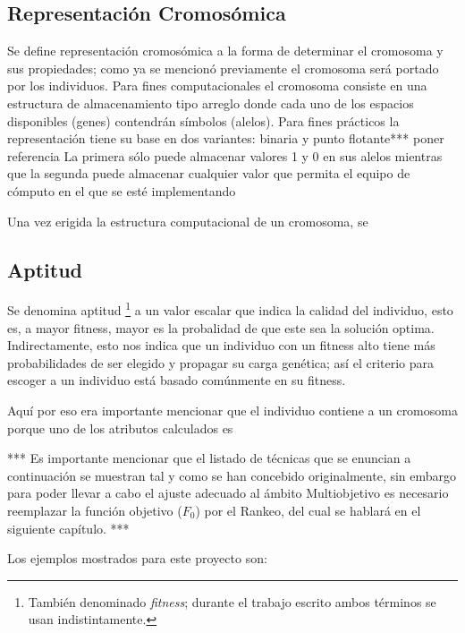 \documentclass[class=report, crop=false]{standalone}
\begin{document}
\subsection{Representación Cromosómica}
\label{sec:c2_5}
Se define representación cromosómica a la forma de determinar 
el cromosoma y sus propiedades; como ya se mencionó previamente 
el cromosoma será portado por los individuos.\break
Para fines computacionales el cromosoma consiste en una estructura de almacenamiento tipo arreglo donde
cada uno de los espacios disponibles (genes) contendrán símbolos (alelos).
Para fines prácticos la representación tiene su base en dos variantes: binaria y punto flotante*** poner referencia
La primera sólo puede almacenar valores 1 y 0 en sus alelos mientras que la segunda puede almacenar cualquier valor que
permita el equipo de cómputo en el que se esté implementando


Una vez erigida la estructura computacional de un cromosoma, se


\subsection{Aptitud}
\label{sec:c2_3}
Se denomina aptitud \footnote{También denominado \textit{fitness}; 
durante el trabajo escrito ambos términos se usan indistintamente.} 
a un valor escalar que indica la calidad del individuo, esto es, 
a mayor fitness, mayor es la probalidad de que este sea la 
solución optima.\break
Indirectamente, esto nos indica que un individuo con un 
fitness alto tiene más probabilidades de ser elegido y propagar 
su carga genética; así el criterio para escoger a un individuo 
está basado comúnmente en su fitness.\medskip\break

Aquí por eso era importante mencionar que el individuo contiene
a un cromosoma porque uno de los atributos calculados es 


***
Es importante mencionar que el listado de técnicas que se 
enuncian a continuación se muestran tal y como se han concebido 
originalmente, sin embargo para poder llevar a cabo el ajuste 
adecuado al ámbito Multiobjetivo es necesario reemplazar la 
función objetivo ($F_0$) por el Rankeo, del cual se hablará 
en el siguiente capítulo.\medskip\break
***

Los ejemplos mostrados para este proyecto son:
\end{document}
